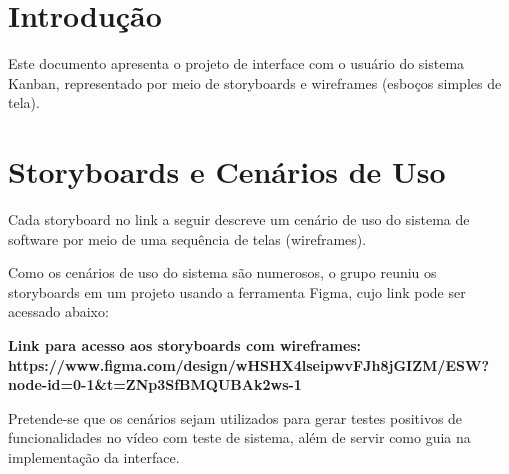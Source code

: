 \section{Introdução}
Este documento apresenta o projeto de interface com o usuário do sistema Kanban, representado por meio de storyboards e wireframes (esboços simples de tela).

\section{Storyboards e Cenários de Uso}
Cada storyboard no link a seguir descreve um cenário de uso do sistema de software por meio de uma sequência de telas (wireframes).

Como os cenários de uso do sistema são numerosos, o grupo reuniu os storyboards em um projeto usando a ferramenta Figma, cujo link pode ser acessado abaixo:

\textbf{Link para acesso aos storyboards com wireframes: https://www.figma.com/design/wHSHX4lseipwvFJh8jGIZM/ESW?node-id=0-1&t=ZNp3SfBMQUBAk2ws-1} 

Pretende-se que os cenários sejam utilizados para gerar testes positivos de funcionalidades no vídeo com teste de sistema, além de servir como guia na implementação da interface.

